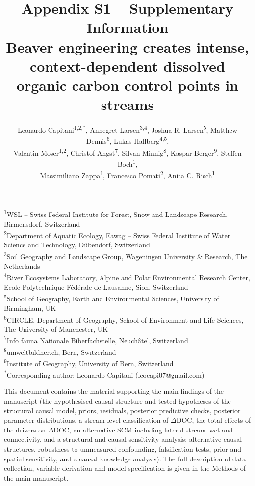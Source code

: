 \documentclass[11pt,a4paper]{article}
\title{Appendix S1 -- Supplementary Information\\[6pt]
\large Beaver engineering creates intense, context-dependent dissolved organic carbon control points in streams}
\author{\normalsize Leonardo Capitani\textsuperscript{1,2,*}, Annegret Larsen\textsuperscript{3,4}, Joshua R. Larsen\textsuperscript{5}, Matthew Dennis\textsuperscript{6}, Lukas Hallberg\textsuperscript{4,5},\\
\normalsize Valentin Moser\textsuperscript{1,2}, Christof Angst\textsuperscript{7}, Silvan Minnig\textsuperscript{8}, Kaspar Berger\textsuperscript{9}, Steffen Boch\textsuperscript{1},\\
\normalsize Massimiliano Zappa\textsuperscript{1}, Francesco Pomati\textsuperscript{2}, Anita C. Risch\textsuperscript{1}}
\date{}
\begin{document}
\maketitle
\vspace{-2em}
\begin{center}\footnotesize
\textsuperscript{1}WSL -- Swiss Federal Institute for Forest, Snow and Landscape Research, Birmensdorf, Switzerland\\
\textsuperscript{2}Department of Aquatic Ecology, Eawag -- Swiss Federal Institute of Water Science and Technology, D\"ubendorf, Switzerland\\
\textsuperscript{3}Soil Geography and Landscape Group, Wageningen University \& Research, The Netherlands\\
\textsuperscript{4}River Ecosystems Laboratory, Alpine and Polar Environmental Research Center, Ecole Polytechnique F\'ed\'erale de Lausanne, Sion, Switzerland\\
\textsuperscript{5}School of Geography, Earth and Environmental Sciences, University of Birmingham, UK\\
\textsuperscript{6}CIRCLE, Department of Geography, School of Environment and Life Sciences, The University of Manchester, UK\\
\textsuperscript{7}Info fauna Nationale Biberfachstelle, Neuch\^atel, Switzerland\\
\textsuperscript{8}umweltbildner.ch, Bern, Switzerland\\
\textsuperscript{9}Institute of Geography, University of Bern, Switzerland\\[4pt]
\textsuperscript{*}Corresponding author: Leonardo Capitani (leocapi07@gmail.com)
\end{center}

This document contains the material supporting the main findings of the manuscript (the hypothesised causal structure and tested hypotheses of the structural causal model, priors, residuals, posterior predictive checks, posterior parameter distributions, a stream-level classification of $\Delta$DOC, the total effects of the drivers on $\Delta$DOC, an alternative SCM including lateral stream--wetland connectivity, and a structural and causal sensitivity analysis: alternative causal structures, robustness to unmeasured confounding, falsification tests, prior and spatial sensitivity, and a causal knowledge analysis). The full description of data collection, variable derivation and model specification is given in the Methods of the main manuscript.
\end{document}
